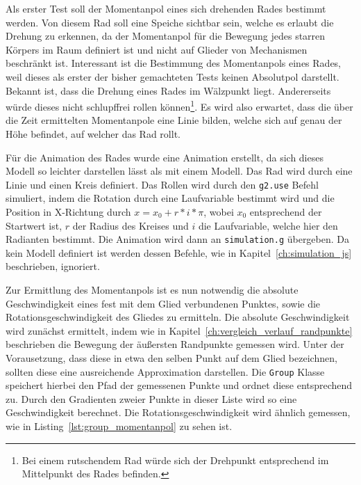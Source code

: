 Als erster Test soll der Momentanpol eines sich drehenden Rades bestimmt werden.
Von diesem Rad soll eine Speiche sichtbar sein, welche es erlaubt die Drehung zu erkennen, da der Momentanpol für die Bewegung jedes starren Körpers im Raum definiert ist und nicht auf Glieder von Mechanismen beschränkt ist.
Interessant ist die Bestimmung des Momentanpols eines Rades, weil dieses als erster der bisher gemachteten Tests keinen Absolutpol darstellt.
Bekannt ist, dass die Drehung eines Rades im Wälzpunkt liegt.
Andererseits würde dieses nicht schlupffrei rollen können\footnote{Bei einem rutschendem Rad würde sich der Drehpunkt entsprechend im Mittelpunkt des Rades befinden.}.
Es wird also erwartet, dass die über die Zeit ermittelten Momentanpole eine Linie bilden, welche sich auf genau der Höhe befindet, auf welcher das Rad rollt.

Für die Animation des Rades wurde eine  Animation erstellt,
da sich dieses Modell so leichter darstellen lässt als mit einem  Modell.
Das Rad wird durch eine Linie und einen Kreis definiert.
Das Rollen wird durch den \lstinline{g2.use} Befehl simuliert, indem die Rotation durch eine Laufvariable bestimmt wird und die Position in X-Richtung durch $x = x_0 + r * i * \pi$, wobei $x_0$ entsprechend der Startwert ist, $r$ der Radius des Kreises und $i$ die Laufvariable, welche hier den Radianten bestimmt.
Die Animation wird dann an \lstinline{simulation.g} übergeben.
Da kein  Modell definiert ist werden dessen Befehle, wie in Kapitel~\ref{ch:simulation_js} beschrieben, ignoriert.

Zur Ermittlung des Momentanpols ist es nun notwendig die absolute Geschwindigkeit eines fest mit dem Glied verbundenen Punktes, sowie die Rotationsgeschwindigkeit des Gliedes zu ermitteln.
Die absolute Geschwindigkeit wird zunächst ermittelt, indem wie in Kapitel~\ref{ch:vergleich_verlauf_randpunkte} beschrieben die Bewegung der äu{\ss}ersten Randpunkte gemessen wird.
Unter der Vorausetzung, dass diese in etwa den selben Punkt auf dem Glied bezeichnen, sollten diese eine ausreichende Approximation darstellen.
Die \lstinline{Group} Klasse speichert hierbei den Pfad der gemessenen Punkte und ordnet diese entsprechend zu.
Durch den Gradienten zweier Punkte in dieser Liste wird so eine Geschwindigkeit berechnet.
Die Rotationsgeschwindigkeit wird ähnlich gemessen, wie in Listing~\ref{lst:group_momentanpol} zu sehen ist.

